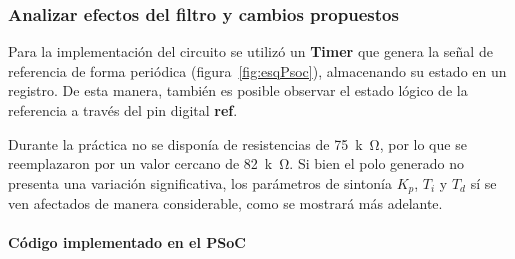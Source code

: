 \subsubsection{Analizar efectos del filtro y cambios propuestos}
Para la implementación del circuito se utilizó un \textbf{Timer} que genera la señal de referencia de forma periódica (figura~\ref{fig:esqPsoc}), almacenando su estado en un registro. De esta manera, también es posible observar el estado lógico de la referencia a través del pin digital \textbf{ref}.  

Durante la práctica no se disponía de resistencias de \SI{75}{k\ohm}, por lo que se reemplazaron por un valor cercano de \SI{82}{k\ohm}. Si bien el polo generado no presenta una variación significativa, los parámetros de sintonía $K_p$, $T_i$ y $T_d$ sí se ven afectados de manera considerable, como se mostrará más adelante.


\onecolumn

\paragraph{Código implementado en el PSoC}\hfill \break

